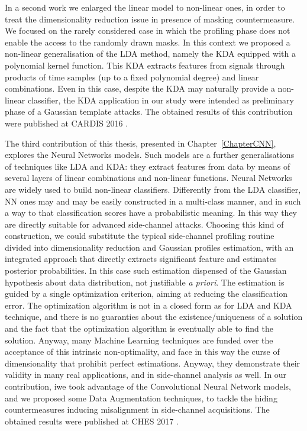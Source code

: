 In a second work we enlarged the linear model to non-linear ones, in order to treat the dimensionality reduction issue in presence of masking countermeasure. We focused on the rarely considered case in which the profiling phase does not enable the access to the randomly drawn masks. In this context we proposed a non-linear generalisation  of the LDA method, namely the KDA equipped with a polynomial kernel function. This KDA extracts features from signals through products of time samples (up to a fixed polynomial degree) and linear combinations. Even in this case, despite the KDA may naturally provide a non-linear classifier, the KDA application in our study were intended as preliminary phase of a Gaussian template attacks. The obtained results of this contribution were published at CARDIS 2016 \cite{cagli2016kernel}.


 The third contribution of this thesis, presented in Chapter~\ref{ChapterCNN}, explores the Neural Networks models. Such models are a further generalisations of techniques like LDA and KDA: they extract features from data by means of several layers of linear combinations and non-linear functions. Neural Networks are widely used to build non-linear classifiers. Differently from the LDA classifier, NN ones may and may be easily constructed in a multi-class manner, and in such a way to that classification scores have a probabilistic meaning. In this way they are directly suitable for advanced side-channel attacks. Choosing this kind of construction, we could substitute the typical side-channel profiling routine divided into dimensionality reduction and Gaussian profiles estimation, with an integrated approach that directly extracts significant feature and estimates posterior probabilities. In this case such estimation dispensed of  the Gaussian hypothesis about data distribution, not justifiable \textit{a priori}. The estimation is guided by a single optimization criterion, aiming at reducing the classification error. The optimization algorithm is not in a closed form as for LDA and KDA technique, and there is no guaranties about the existence/uniqueness of a solution and the fact that the optimization algorithm is eventually able to find the solution. Anyway, many Machine Learning techniques are funded over the acceptance of this intrinsic non-optimality, and face in this way the curse of dimensionality that prohibit perfect estimations. Anyway, they demonstrate their validity in many real applications, and in side-channel analysis as well. In our contribution, iwe took advantage of the Convolutional Neural Network models, and we proposed some Data Augmentation techniques, to tackle the hiding countermeasures inducing misalignment in side-channel acquisitions. The obtained results were published at CHES 2017 \cite{DBLP:conf/ches/CagliDP17}.\\
 




